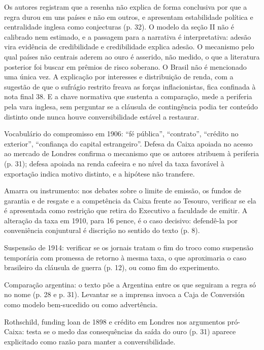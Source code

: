 Os autores registram que a resenha não explica de forma conclusiva por que a
regra durou em uns países e não em outros, e apresentam estabilidade política e
centralidade inglesa como conjecturas (p. 32). O modelo da seção II não é
calibrado nem estimado, e a passagem para a narrativa é interpretativa: adesão
vira evidência de credibilidade e credibilidade explica adesão. O mecanismo
pelo qual países não centrais aderem ao ouro é asserido, não medido, o que a
literatura posterior foi buscar em prêmios de risco soberano. O Brasil não é
mencionado uma única vez. A explicação por interesses e distribuição de renda,
com a sugestão de que o sufrágio restrito freava as forças inflacionistas, fica
confinada à nota final 38. E a chave normativa que sustenta a comparação,
mede a periferia pela vara inglesa, sem perguntar se a cláusula de contingência
podia ter conteúdo distinto onde nunca houve conversibilidade estável a
restaurar.

\begin{dialogo}
\item Vocabulário do compromisso em 1906: ``fé pública'', ``contrato'',
``crédito no exterior'', ``confiança do capital estrangeiro''. Defesa da Caixa
apoiada no acesso ao mercado de Londres confirma o mecanismo que os autores
atribuem à periferia (p. 31); defesa apoiada na renda cafeeira e no nível da
taxa favorável à exportação indica motivo distinto, e a hipótese não transfere.
\item Amarra ou instrumento: nos debates sobre o limite de emissão, os fundos
de garantia e de resgate e a competência da Caixa frente ao Tesouro, verificar
se ela é apresentada como restrição que retira do Executivo a faculdade de
emitir. A alteração da taxa em 1910, para 16 pence, é o caso decisivo: defendê-la
por conveniência conjuntural é discrição no sentido do texto (p. 8).
\item Suspensão de 1914: verificar se os jornais tratam o fim do troco como
suspensão temporária com promessa de retorno à mesma taxa, o que aproximaria o
caso brasileiro da cláusula de guerra (p. 12), ou como fim do experimento.
\item Comparação argentina: o texto põe a Argentina entre os que seguiram a
regra só no nome (p. 28 e p. 31). Levantar se a imprensa invoca a Caja de
Conversión como modelo bem-sucedido ou como advertência.
\item Rothschild, funding loan de 1898 e crédito em Londres nos argumentos
pró-Caixa: testa se o medo das consequências da saída do ouro (p. 31) aparece
explicitado como razão para manter a conversibilidade.
\end{dialogo}

